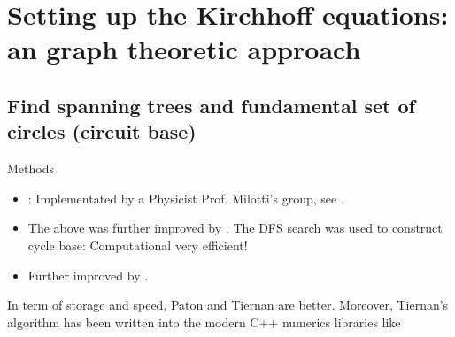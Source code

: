 \documentclass[xcolor=dvipsnames]{beamer}
\begin{document}
\section{Setting up the Kirchhoff equations: an graph theoretic approach }

\subsection{Find spanning trees and fundamental set of circles (circuit base)}

\begin{frame}{Methods}
	\begin{itemize}
		\item  \href{https://dl.acm.org/doi/pdf/10.1145/363848.363861}{}: Implementated by a Physicist Prof. Milotti's group, see \href{https://github.com/edymil/CircuitMath}{}.
		\item The above was further improved by \href{http://www.cs.kent.edu/~dragan/GraphAn/CycleBasis/p514-paton.pdf}{}. The DFS search was used to construct cycle base: Computational very efficient!
		\item Further improved by \href{https://dl.acm.org/doi/pdf/10.1145/362814.362819}{}. %
	\end{itemize}
	In term of storage and speed, Paton and Tiernan are better. Moreover, Tiernan's algorithm has been written into the modern C++ numerics libraries like \href{https://www.boost.org/}{}
\end{frame}
\end{document}
